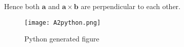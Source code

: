 \documentclass[journal,12pt,twocolumn]{IEEEtran}
\let\vec\mathbf
\begin{document}
          
          Hence both $\vec{a}$ and $\vec{a}\times\vec{b}$ are perpendicular to each other.
          \begin{figure}[h!]
              \centering
              \texttt{[image: A2python.png]}
              \caption{Python generated figure}
              \label{fig:my_label}
          \end{figure}
          
\end{document}
